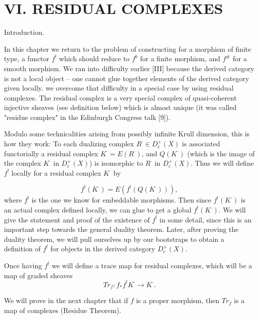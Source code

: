 \documentclass[12pt]{book}
\begin{document}
\setcounter{page}{302}
\chapter{VI. RESIDUAL COMPLEXES}

Introduction.

In this chapter we return to the problem of constructing for a morphism of finite
type, a functor \(f^{!}\) which should reduce to \(f^{b}\) for a finite morphism, and \(f^{\#}\) for a smooth
morphism. We ran into difficulty earlier [III] because the
derived category is not a local object -- one cannot glue together elements of the derived category given locally.
we overcome that difficulty in a special case by using residual complexes. The residual complex is a very special complex of quasi-coherent injective sheaves (see definition below) which is almost unique (it was called "residue complex" in the Edinburgh Congress talk [9]).

Modulo some technicalities arising from possibly infinite Krull dimension, this is how they work: To each dualizing complex \(R^{\cdot} \in D_{c}^{+}(X)\) is associated functorially a residual complex \(K^{\cdot}=E(R^{\cdot})\), and \(Q(K^{\cdot})\) (which is the image of the complex \(K^{\cdot}\) in \(D_{c}^{+}(X)\)) is isomorphic to \(R^{\cdot}\) in \(D_{c}^{+}(X)\).
Thus we will define \(f^{!}\) locally for a residual complex \(K^{\cdot}\) by

\setcounter{page}{303}
\[f^{!}\left(K^{\cdot}\right)=E\left(f^{!}\left(Q\left(K^{\cdot}\right)\right)\right),\]
where \(f^{!}\) is the one we know for embeddable morphisms. Then since \(f^{!}(K^{\cdot})\) is an actual complex defined locally, we can glue to get a global \(f^{!}(K^{\cdot})\).
We will give the statement and proof of the existence of \(f^{!}\) in some detail, since this is an important step towards the general duality theorem. Later, after proving the duality theorem, we will pull ourselves up by our bootstraps to obtain a definition of \(f^{!}\) for objects in the derived category \(D_{c}^{+}(X)\).

Once having \(f^{!}\) we will define a trace map for residual complexes, which will be a map of graded sheaves
\[Tr_{f}: f_{*} f^{!} K^{\cdot} \to K^{\cdot}.\]

We will prove in the next chapter that if \(f\) is a proper morphism, then \(Tr_{f}\) is a map of complexes (Residue Theorem).
\end{document}
